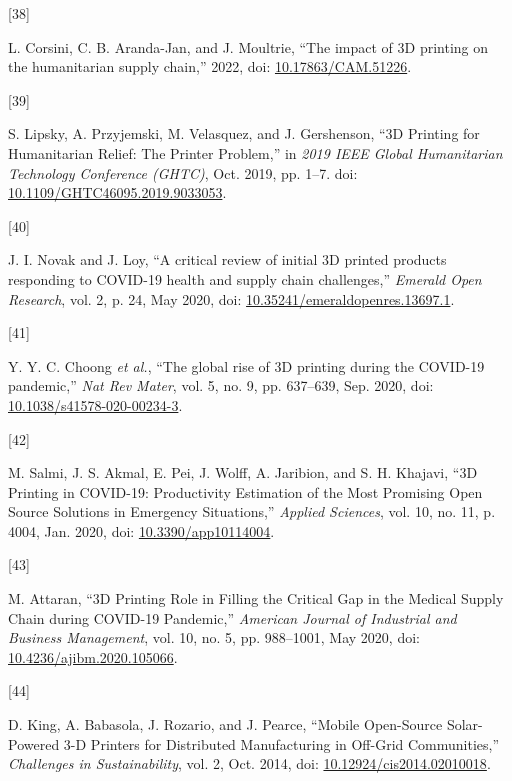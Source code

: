 \documentclass[
]{article}
\newlength{\cslhangindent}
\newlength{\csllabelwidth}
\newlength{\cslentryspacingunit} %
\newenvironment{CSLReferences}[2] %
 {%
  \setlength{\parindent}{0pt}
  \ifodd #1
  \let\oldpar\par
  \def\par{\hangindent=\cslhangindent\oldpar}
  \fi
  \setlength{\parskip}{#2\cslentryspacingunit}
 }%
 {}
\newcommand{\CSLLeftMargin}[1]{\parbox[t]{\csllabelwidth}{#1}}
\newcommand{\CSLRightInline}[1]{\parbox[t]{\linewidth - \csllabelwidth}{#1}\break}
\begin{document}
\begin{CSLReferences}{0}{0}
\leavevmode{}%
\CSLLeftMargin{{[}38{]} }%
\CSLRightInline{L. Corsini, C. B. Aranda-Jan, and J. Moultrie, {``The
impact of {3D} printing on the humanitarian supply chain,''} 2022, doi:
\href{https://doi.org/10.17863/CAM.51226}{10.17863/CAM.51226}.}

\leavevmode{}%
\CSLLeftMargin{{[}39{]} }%
\CSLRightInline{S. Lipsky, A. Przyjemski, M. Velasquez, and J.
Gershenson, {``{3D Printing} for {Humanitarian Relief}: {The Printer
Problem},''} in \emph{2019 {IEEE Global Humanitarian Technology
Conference} ({GHTC})}, Oct. 2019, pp. 1--7. doi:
\href{https://doi.org/10.1109/GHTC46095.2019.9033053}{10.1109/GHTC46095.2019.9033053}.}

\leavevmode{}%
\CSLLeftMargin{{[}40{]} }%
\CSLRightInline{J. I. Novak and J. Loy, {``A critical review of initial
{3D} printed products responding to {COVID-19} health and supply chain
challenges,''} \emph{Emerald Open Research}, vol. 2, p. 24, May 2020,
doi:
\href{https://doi.org/10.35241/emeraldopenres.13697.1}{10.35241/emeraldopenres.13697.1}.}

\leavevmode{}%
\CSLLeftMargin{{[}41{]} }%
\CSLRightInline{Y. Y. C. Choong \emph{et al.}, {``The global rise of 3D
printing during the {COVID}-19 pandemic,''} \emph{Nat Rev Mater}, vol.
5, no. 9, pp. 637--639, Sep. 2020, doi:
\href{https://doi.org/10.1038/s41578-020-00234-3}{10.1038/s41578-020-00234-3}.}

\leavevmode{}%
\CSLLeftMargin{{[}42{]} }%
\CSLRightInline{M. Salmi, J. S. Akmal, E. Pei, J. Wolff, A. Jaribion,
and S. H. Khajavi, {``{3D Printing} in {COVID-19}: {Productivity
Estimation} of the {Most Promising Open Source Solutions} in {Emergency
Situations},''} \emph{Applied Sciences}, vol. 10, no. 11, p. 4004, Jan.
2020, doi:
\href{https://doi.org/10.3390/app10114004}{10.3390/app10114004}.}

\leavevmode{}%
\CSLLeftMargin{{[}43{]} }%
\CSLRightInline{M. Attaran, {``{3D Printing Role} in {Filling} the
{Critical Gap} in the {Medical Supply Chain} during {COVID-19
Pandemic},''} \emph{American Journal of Industrial and Business
Management}, vol. 10, no. 5, pp. 988--1001, May 2020, doi:
\href{https://doi.org/10.4236/ajibm.2020.105066}{10.4236/ajibm.2020.105066}.}

\leavevmode{}%
\CSLLeftMargin{{[}44{]} }%
\CSLRightInline{D. King, A. Babasola, J. Rozario, and J. Pearce,
{``Mobile {Open-Source Solar-Powered} 3-{D Printers} for {Distributed
Manufacturing} in {Off-Grid Communities},''} \emph{Challenges in
Sustainability}, vol. 2, Oct. 2014, doi:
\href{https://doi.org/10.12924/cis2014.02010018}{10.12924/cis2014.02010018}.}


\end{CSLReferences}
\end{document}
